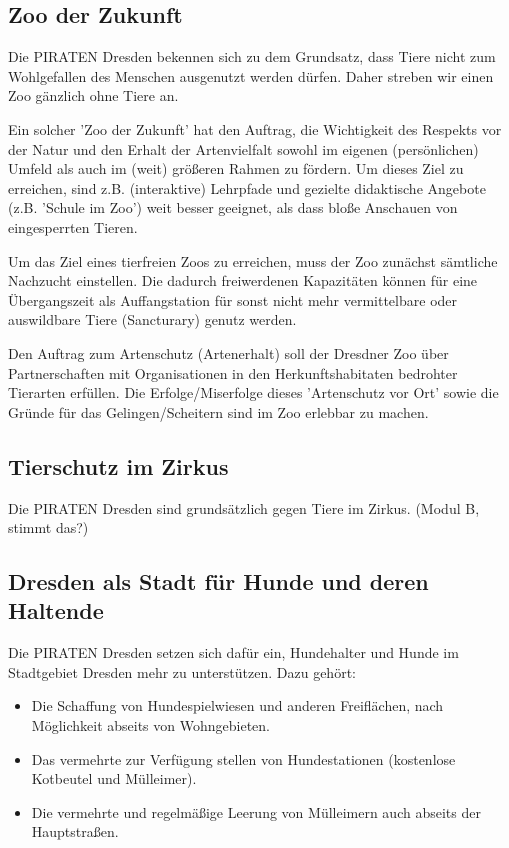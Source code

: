 \documentclass[a4paper, 11pt]{article}
\begin{document}
\subsection{Zoo der Zukunft}
Die PIRATEN Dresden bekennen sich zu dem Grundsatz, dass Tiere nicht zum Wohlgefallen des Menschen ausgenutzt werden dürfen. Daher streben wir einen Zoo gänzlich ohne Tiere an.\newline

Ein solcher 'Zoo der Zukunft' hat den Auftrag, die Wichtigkeit des Respekts vor der Natur und den Erhalt der Artenvielfalt sowohl im eigenen (persönlichen) Umfeld als auch im (weit) größeren Rahmen zu fördern. Um dieses Ziel zu erreichen, sind z.B. (interaktive) Lehrpfade und gezielte didaktische Angebote (z.B. 'Schule im Zoo') weit besser geeignet, als dass bloße Anschauen von eingesperrten Tieren.\newline

Um das Ziel eines tierfreien Zoos zu erreichen, muss der Zoo zunächst sämtliche Nachzucht einstellen. Die dadurch freiwerdenen Kapazitäten können für eine Übergangszeit als Auffangstation für sonst nicht mehr vermittelbare oder auswildbare Tiere (Sancturary) genutz werden.\newline

Den Auftrag zum Artenschutz (Artenerhalt) soll der Dresdner Zoo über Partnerschaften mit Organisationen in den Herkunftshabitaten bedrohter Tierarten erfüllen. Die Erfolge/Miserfolge dieses 'Artenschutz vor Ort' sowie die Gründe für das Gelingen/Scheitern sind im Zoo erlebbar zu machen.


\subsection{Tierschutz im Zirkus}
Die PIRATEN Dresden sind grundsätzlich gegen Tiere im Zirkus. (Modul B, stimmt das?)


\subsection{Dresden als Stadt für Hunde und deren Haltende}
Die PIRATEN Dresden setzen sich dafür ein, Hundehalter und Hunde im Stadtgebiet Dresden mehr zu unterstützen. Dazu gehört:

\begin{itemize}
	\item Die Schaffung von Hundespielwiesen und anderen Freiflächen, nach Möglichkeit abseits von Wohngebieten.

	\item Das vermehrte zur Verfügung stellen von Hundestationen (kostenlose Kotbeutel und Mülleimer).

	\item Die vermehrte und regelmäßige Leerung von Mülleimern auch abseits der Hauptstraßen.
\end{itemize}
\end{document}
